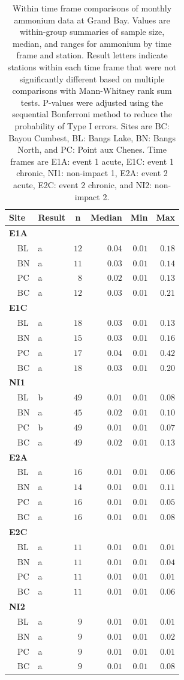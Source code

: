 \documentclass[letterpaper,12pt]{article}\usepackage[]{graphicx}\usepackage[]{color}
\begin{document}
\clearpage

\begin{table}[!tbp]
\caption{Within time frame comparisons of monthly ammonium data at Grand Bay.  Values are within-group summaries of sample size, median, and ranges for ammonium by time frame and station.  Result letters indicate stations within each time frame that were not significantly different based on multiple comparisons with Mann-Whitney rank sum tests.  P-values were adjusted using the sequential Bonferroni method to reduce the probability of Type I errors. Sites are BC: Bayou Cumbest, BL: Bangs Lake, BN: Bangs North, and PC: Point aux Chenes.  Time frames are E1A: event 1 acute, E1C: event 1 chronic, NI1: non-impact 1, E2A: event 2 acute, E2C: event 2 chronic, and NI2: non-impact 2.\label{tab:ammontab2}} 
\begin{center}
\begin{tabular}{llrrrr}
\hline\hline
\multicolumn{1}{l}{Site}&\multicolumn{1}{c}{Result}&\multicolumn{1}{c}{n}&\multicolumn{1}{c}{Median}&\multicolumn{1}{c}{Min}&\multicolumn{1}{c}{Max}\tabularnewline
\hline
{\bfseries E1A}&&&&&\tabularnewline
~~BL&a&$12$&$0.04$&$0.01$&$0.18$\tabularnewline
~~BN&a&$11$&$0.03$&$0.01$&$0.14$\tabularnewline
~~PC&a&$ 8$&$0.02$&$0.01$&$0.13$\tabularnewline
~~BC&a&$12$&$0.03$&$0.01$&$0.21$\tabularnewline
\hline
{\bfseries E1C}&&&&&\tabularnewline
~~BL&a&$18$&$0.03$&$0.01$&$0.13$\tabularnewline
~~BN&a&$15$&$0.03$&$0.01$&$0.16$\tabularnewline
~~PC&a&$17$&$0.04$&$0.01$&$0.42$\tabularnewline
~~BC&a&$18$&$0.03$&$0.01$&$0.20$\tabularnewline
\hline
{\bfseries NI1}&&&&&\tabularnewline
~~BL&b&$49$&$0.01$&$0.01$&$0.08$\tabularnewline
~~BN&a&$45$&$0.02$&$0.01$&$0.10$\tabularnewline
~~PC&b&$49$&$0.01$&$0.01$&$0.07$\tabularnewline
~~BC&a&$49$&$0.02$&$0.01$&$0.13$\tabularnewline
\hline
{\bfseries E2A}&&&&&\tabularnewline
~~BL&a&$16$&$0.01$&$0.01$&$0.06$\tabularnewline
~~BN&a&$14$&$0.01$&$0.01$&$0.11$\tabularnewline
~~PC&a&$16$&$0.01$&$0.01$&$0.05$\tabularnewline
~~BC&a&$16$&$0.01$&$0.01$&$0.08$\tabularnewline
\hline
{\bfseries E2C}&&&&&\tabularnewline
~~BL&a&$11$&$0.01$&$0.01$&$0.01$\tabularnewline
~~BN&a&$11$&$0.01$&$0.01$&$0.04$\tabularnewline
~~PC&a&$11$&$0.01$&$0.01$&$0.01$\tabularnewline
~~BC&a&$11$&$0.01$&$0.01$&$0.06$\tabularnewline
\hline
{\bfseries NI2}&&&&&\tabularnewline
~~BL&a&$ 9$&$0.01$&$0.01$&$0.01$\tabularnewline
~~BN&a&$ 9$&$0.01$&$0.01$&$0.02$\tabularnewline
~~PC&a&$ 9$&$0.01$&$0.01$&$0.01$\tabularnewline
~~BC&a&$ 9$&$0.01$&$0.01$&$0.08$\tabularnewline
\hline
\end{tabular}\end{center}

\end{table}
\end{document}
